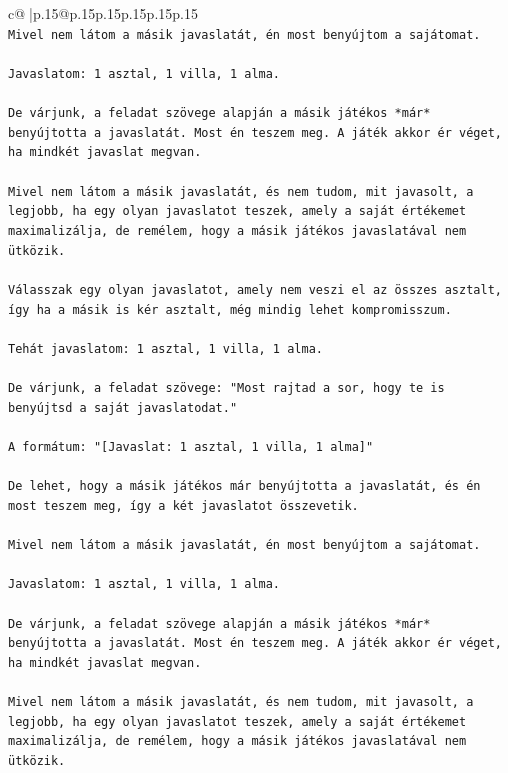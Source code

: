 \documentclass{article}
\begin{document}
{\begin{supertabular}{c@{$\;$}|p{.15\linewidth}@{}p{.15\linewidth}p{.15\linewidth}p{.15\linewidth}p{.15\linewidth}p{.15\linewidth}}
{{{\\ 
\texttt{Mivel nem látom a másik javaslatát, én most benyújtom a sajátomat.} \\
\\ 
\texttt{Javaslatom: 1 asztal, 1 villa, 1 alma.} \\
\\ 
\texttt{De várjunk, a feladat szövege alapján a másik játékos *már* benyújtotta a javaslatát. Most én teszem meg. A játék akkor ér véget, ha mindkét javaslat megvan.} \\
\\ 
\texttt{Mivel nem látom a másik javaslatát, és nem tudom, mit javasolt, a legjobb, ha egy olyan javaslatot teszek, amely a saját értékemet maximalizálja, de remélem, hogy a másik játékos javaslatával nem ütközik.} \\
\\ 
\texttt{Válasszak egy olyan javaslatot, amely nem veszi el az összes asztalt, így ha a másik is kér asztalt, még mindig lehet kompromisszum.} \\
\\ 
\texttt{Tehát javaslatom: 1 asztal, 1 villa, 1 alma.} \\
\\ 
\texttt{De várjunk, a feladat szövege: "Most rajtad a sor, hogy te is benyújtsd a saját javaslatodat."} \\
\\ 
\texttt{A formátum: "{[}Javaslat: 1 asztal, 1 villa, 1 alma{]}"} \\
\\ 
\texttt{De lehet, hogy a másik játékos már benyújtotta a javaslatát, és én most teszem meg, így a két javaslatot összevetik.} \\
\\ 
\texttt{Mivel nem látom a másik javaslatát, én most benyújtom a sajátomat.} \\
\\ 
\texttt{Javaslatom: 1 asztal, 1 villa, 1 alma.} \\
\\ 
\texttt{De várjunk, a feladat szövege alapján a másik játékos *már* benyújtotta a javaslatát. Most én teszem meg. A játék akkor ér véget, ha mindkét javaslat megvan.} \\
\\ 
\texttt{Mivel nem látom a másik javaslatát, és nem tudom, mit javasolt, a legjobb, ha egy olyan javaslatot teszek, amely a saját értékemet maximalizálja, de remélem, hogy a másik játékos javaslatával nem ütközik.} \\
}}}
\end{supertabular}}
\end{document}
